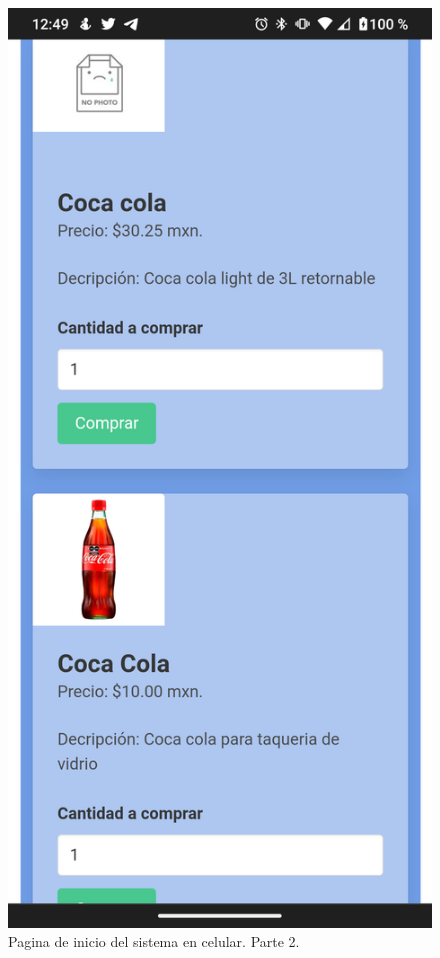 \documentclass[11pt]{article}
\begin{document}
		\begin{figure}[H]
			\centering
			\includegraphics[scale=0.27]{resources/Screenshot_20211113-004950.png}
			\caption{Pagina de inicio del sistema en celular. Parte 2.}\label{fig:picture}
		\end{figure}
\end{document}
